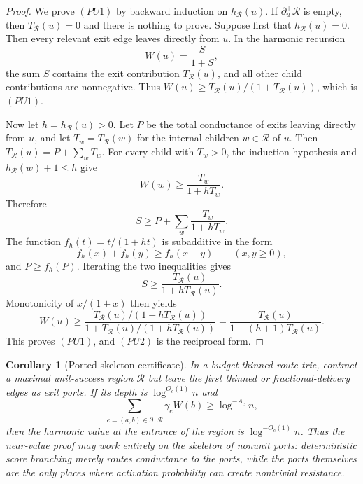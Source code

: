 \documentclass[10pt]{article}
\newtheorem{corollary}[theorem]{Corollary}
\theoremstyle{definition}
\begin{document}
\begin{proof}
   We prove \((PU1)\) by backward induction on \(h_{\mathcal R}(u)\).  If
   \(\partial^+_u\mathcal R\) is empty, then \(T_{\mathcal R}(u)=0\) and there
   is nothing to prove.  Suppose first that \(h_{\mathcal R}(u)=0\).  Then
   every relevant exit edge leaves directly from \(u\).  In the harmonic
   recursion
   \[
      W(u)=\frac{S}{1+S},
   \]
   the sum \(S\) contains the exit contribution \(T_{\mathcal R}(u)\), and all
   other child contributions are nonnegative.  Thus
   \(W(u)\ge T_{\mathcal R}(u)/(1+T_{\mathcal R}(u))\), which is \((PU1)\).

   Now let \(h=h_{\mathcal R}(u)>0\).  Let \(P\) be the total conductance of
   exits leaving directly from \(u\), and let \(T_w=T_{\mathcal R}(w)\) for
   the internal children \(w\in\mathcal R\) of \(u\).  Then
   \(T_{\mathcal R}(u)=P+\sum_wT_w\).  For every child with \(T_w>0\), the
   induction hypothesis and \(h_{\mathcal R}(w)+1\le h\) give
   \[
      W(w)\ge\frac{T_w}{1+hT_w}.
   \]
   Therefore
   \[
      S\ge
      P+\sum_w\frac{T_w}{1+hT_w}.
   \]
   The function \(f_h(t)=t/(1+ht)\) is subadditive in the form
   \[
      f_h(x)+f_h(y)\ge f_h(x+y)
      \qquad(x,y\ge0),
   \]
   and \(P\ge f_h(P)\).  Iterating the two inequalities gives
   \[
      S\ge \frac{T_{\mathcal R}(u)}
                 {1+hT_{\mathcal R}(u)} .
   \]
   Monotonicity of \(x/(1+x)\) then yields
   \[
      W(u)\ge
      \frac{T_{\mathcal R}(u)/(1+hT_{\mathcal R}(u))}
           {1+T_{\mathcal R}(u)/(1+hT_{\mathcal R}(u))}
      =
      \frac{T_{\mathcal R}(u)}
           {1+(h+1)T_{\mathcal R}(u)} .
   \]
   This proves \((PU1)\), and \((PU2)\) is the reciprocal form.
\end{proof}

\begin{corollary}[Ported skeleton certificate]
   \label{cor:ported-skeleton-certificate}
   In a budget-thinned route trie, contract a maximal unit-success region
   \(\mathcal R\) but leave the first thinned or fractional-delivery edges as
   exit ports.  If its depth is \(\log^{O_c(1)}n\) and
   \[
      \sum_{e=(a,b)\in\partial^+\mathcal R}\gamma_eW(b)
      \ge\log^{-A_c}n ,
   \]
   then the harmonic value at the entrance of the region is
   \(\log^{-O_c(1)}n\).  Thus the near-value proof may work entirely on the
   skeleton of nonunit ports: deterministic score branching merely routes
   conductance to the ports, while the ports themselves are the only places
   where activation probability can create nontrivial resistance.
\end{corollary}
\end{document}
